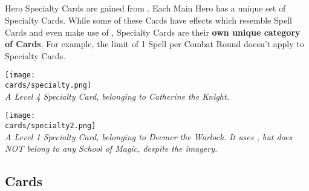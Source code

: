 \begin{multicols*}{2}
\pagebreak
\subsection*{}

Hero Specialty Cards are gained from .
Each Main Hero has a unique set of Specialty Cards.
While some of these Cards have effects which resemble Spell Cards and even make use of , Specialty Cards are their \textbf{own unique category of Cards}.
For example, the limit of 1 Spell per Combat Round doesn't apply to Specialty Cards.

{
    \medskip
    \centering
    \texttt{[image: \\cards/specialty.png]}\\
    \medskip
    \footnotesize\textit{A Level 4 Specialty Card, belonging to Catherine the Knight.}
}

{
    \medskip
    \centering
    \texttt{[image: \\cards/specialty2.png]}\\
    \medskip
    \footnotesize\textit{A Level 1 Specialty Card, belonging to Deemer the Warlock. It uses , but does NOT belong to any School of Magic, despite the imagery.}
}

\subsection*{ Cards}


\end{multicols*}
